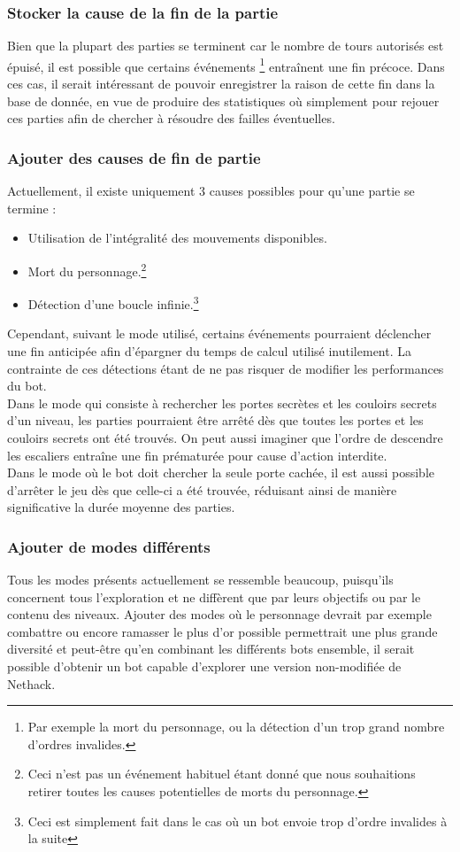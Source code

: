 \documentclass[a4paper,12pt]{article}
\begin{document}
\subsubsection{Stocker la cause de la fin de la partie}
Bien que la plupart des parties se terminent car le nombre de tours autorisés
est épuisé, il est possible que certains événements \footnote{Par exemple la
  mort du personnage, ou la détection d'un trop grand nombre d'ordres
  invalides.} entraînent une fin précoce. Dans ces cas, il serait intéressant
de pouvoir enregistrer la raison de cette fin dans la base de donnée, en vue de
produire des statistiques où simplement pour rejouer ces parties afin de
chercher à résoudre des failles éventuelles.

\subsubsection{Ajouter des causes de fin de partie}
Actuellement, il existe uniquement 3 causes possibles pour qu'une partie se
termine :
\begin{itemize}
\item Utilisation de l'intégralité des mouvements disponibles.
\item Mort du personnage.\footnote{Ceci n'est pas un événement habituel étant
  donné que nous souhaitions retirer toutes les causes potentielles de morts du
  personnage.}
\item Détection d'une boucle infinie.\footnote{Ceci est simplement fait dans le
  cas où un bot envoie trop d'ordre invalides à la suite}
\end{itemize}

Cependant, suivant le mode utilisé, certains événements pourraient déclencher
une fin anticipée afin d'épargner du temps de calcul utilisé inutilement. La
contrainte de ces détections étant de ne pas risquer de modifier les
performances du bot.
\\
Dans le mode qui consiste à rechercher les portes secrètes et les couloirs
secrets d'un niveau, les parties pourraient être arrêté dès que toutes les
portes et les couloirs secrets ont été trouvés. On peut aussi imaginer que
l'ordre de descendre les escaliers entraîne une fin prématurée pour cause
d'action interdite.
\\
Dans le mode où le bot doit chercher la seule porte cachée, il est aussi
possible d'arrêter le jeu dès que celle-ci a été trouvée, réduisant ainsi de
manière significative la durée moyenne des parties.

\subsubsection{Ajouter de modes différents}
Tous les modes présents actuellement se ressemble beaucoup, puisqu'ils
concernent tous l'exploration et ne diffèrent que par leurs objectifs ou par le
contenu des niveaux. Ajouter des modes où le personnage devrait par exemple
combattre ou encore ramasser le plus d'or possible permettrait une plus grande
diversité et peut-être qu'en combinant les différents bots ensemble, il serait
possible d'obtenir un bot capable d'explorer une version non-modifiée de
Nethack.
\end{document}
